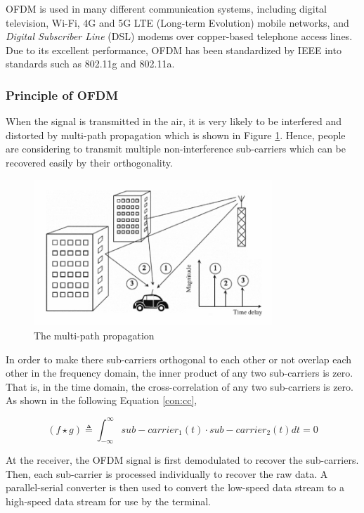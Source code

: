 \documentclass{article}
\begin{document}
OFDM is used in many different communication systems, including digital television, Wi-Fi, 4G and 5G LTE (Long-term Evolution) mobile networks, and \textit{Digital Subscriber Line} (DSL) modems over copper-based telephone access lines. Due to its excellent performance, OFDM has been standardized by IEEE into standards such as 802.11g and 802.11a\cite{RN79}.

\subsubsection{Principle of OFDM}
When the signal is transmitted in the air, it is very likely to be interfered and distorted by multi-path propagation which is shown in Figure \ref{fig:multipath propagation}. Hence, people are considering to transmit multiple non-interference sub-carriers which can be recovered easily by their orthogonality.

\begin{figure}[!h]
\centering
\includegraphics[width=0.8\textwidth]{images/multipath propagation.png}
\caption{\label{fig:multipath propagation}The multi-path propagation}
\end{figure}

In order to make there sub-carriers orthogonal to each other or not overlap each other in the frequency domain, the inner product of any two sub-carriers is zero. That is, in the time domain, the cross-correlation of any two sub-carriers is zero. As shown in the following Equation \ref{con:cc},

\begin{equation}
(f \star g) \triangleq \int_{-\infty}^{\infty} sub-carrier_1(t) \cdot sub-carrier_2(t)dt=0 \label{con:cc}
\end{equation}

At the receiver, the OFDM signal is first demodulated to recover the sub-carriers. Then, each sub-carrier is processed individually to recover the raw data. A parallel-serial converter is then used to convert the low-speed data stream to a high-speed data stream for use by the terminal.
\end{document}
